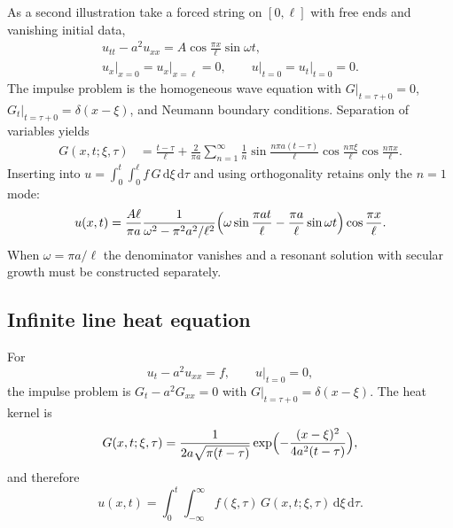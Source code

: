 As a second illustration take a forced string on $[0,\ell]$ with free ends and vanishing initial data,
\begin{equation}
\begin{gathered}
u_{tt}-a^2 u_{xx}=A\cos\frac{\pi x}{\ell}\sin\omega t,\\
u_x\big|_{x=0}=u_x\big|_{x=\ell}=0,
\qquad
u\big|_{t=0}=u_t\big|_{t=0}=0.
\end{gathered}
\end{equation}
The impulse problem is the homogeneous wave equation with $G|_{t=\tau+0}=0$, $G_t|_{t=\tau+0}=\delta(x-\xi)$, and Neumann boundary conditions. Separation of variables yields
\begin{equation}
\begin{aligned}
G(x,t;\xi,\tau)
&=\frac{t-\tau}{\ell}
+\frac{2}{\pi a}\sum_{n=1}^{\infty}\frac{1}{n}
\sin\frac{n\pi a(t-\tau)}{\ell}
\cos\frac{n\pi\xi}{\ell}\cos\frac{n\pi x}{\ell}.
\end{aligned}
\end{equation}
Inserting into $u=\int_0^t\int_0^\ell f\,G\,\mathrm{d}\xi\,\mathrm{d}\tau$ and using orthogonality retains only the $n=1$ mode:
\begin{equation}
u(x,t)
=\frac{A\ell}{\pi a}\frac{1}{\omega^2-\pi^2 a^2/\ell^2}
\Bigl(\omega\sin\frac{\pi a t}{\ell}-\frac{\pi a}{\ell}\sin\omega t\Bigr)
\cos\frac{\pi x}{\ell}.
\end{equation}
When $\omega=\pi a/\ell$ the denominator vanishes and a resonant solution with secular growth must be constructed separately.

\subsection{Infinite line heat equation}

For
\begin{equation}
u_t-a^2 u_{xx}=f,
\qquad
u\big|_{t=0}=0,
\end{equation}
the impulse problem is $G_t-a^2 G_{xx}=0$ with $G|_{t=\tau+0}=\delta(x-\xi)$. The heat kernel is
\begin{equation}
\label{eq:heat-kernel}
G(x,t;\xi,\tau)
=\frac{1}{2a\sqrt{\pi(t-\tau)}}
\exp\Bigl(-\frac{(x-\xi)^2}{4a^2(t-\tau)}\Bigr),
\end{equation}
and therefore
\begin{equation}
u(x,t)
=\int_0^{t}\int_{-\infty}^{\infty}
f(\xi,\tau)\,G(x,t;\xi,\tau)\,\mathrm{d}\xi\,\mathrm{d}\tau.
\end{equation}

